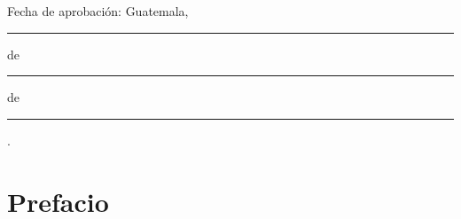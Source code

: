 \documentclass[11pt, letterpaper, twoside, openright]{report}
\newcommand{\defaultparformat}[1]{
	{\setlength{\parskip}{2ex}
     }
}
\begin{document}
	Fecha de aprobación: Guatemala, \rule[1pt]{0.5 in}{1pt} de \rule[1pt]{1 in}{1pt} de \rule[1pt]{1 in}{1pt}.
	\normalsize
\fi

\pagestyle{plain}
\ifdefined\CAPprefacio
	\newpage
	\cleardoublepage{}
    \chapter*{Prefacio}
    \ifdefined\parpordefecto
    	\defaultparformat{a-prefacio}
    \else
    	
    \fi
\fi

\ifdefined\CAPindice
	\newpage
    \cleardoublepage{}
	\renewcommand{\contentsname}{Índice}
    \pdfbookmark{\contentsname}{toc}
	\tableofcontents
\fi

\ifdefined\CAPfiguras
	\newpage
    \cleardoublepage{}
	\renewcommand{\listfigurename}{Lista de figuras}
	\listoffigures
\fi

\ifdefined\CAPcuadros
	\newpage
    \cleardoublepage{}
	\renewcommand{\listtablename}{Lista de cuadros}
	\listoftables
\fi

%
\ifdefined\CAPresumen
	\newpage
	\cleardoublepage{}
\end{document}
